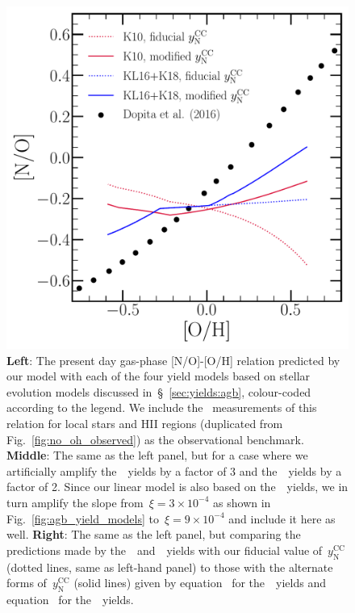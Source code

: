 \documentclass[ms.tex]{subfiles}
\begin{document}
\begin{figure}
\includegraphics[scale = 0.3]{no_oh_predictions_karakas.pdf} 
\caption{
\textbf{Left}: The present day gas-phase [N/O]-[O/H] relation predicted by our 
model with each of the four yield models based on stellar evolution models 
discussed in~\S~\ref{sec:yields:agb}, colour-coded according to the legend. 
We include the~\citet{Dopita2016} measurements of this relation for local stars 
and HII regions (duplicated from Fig.~\ref{fig:no_oh_observed}) as the 
observational benchmark. 
\textbf{Middle}: The same as the left panel, but for a case where we 
artificially amplify the~\cristallo~yields by a factor of 3 and 
the~\ventura~yields by a factor of 2. 
Since our linear model is also based on the~\cristallo~yields, we in turn 
amplify the slope from~$\xi=3\times10^{-4}$ as shown in 
Fig.~\ref{fig:agb_yield_models} to~$\xi=9\times10^{-4}$ and include it here 
as well. 
\textbf{Right}: The same as the left panel, but comparing the predictions 
made by the~\karakasten~and~\karakas~yields with our fiducial value 
of~$y_\text{N}^\text{CC}$ (dotted lines, same as left-hand panel) to those with 
the alternate forms of~$y_\text{N}^\text{CC}$ (solid lines) given by 
equation~ for the~\karakasten~yields and 
equation~ for the~\karakas~yields. 
} 
\label{fig:no_oh_predictions} 
\end{figure} 
\end{document}
